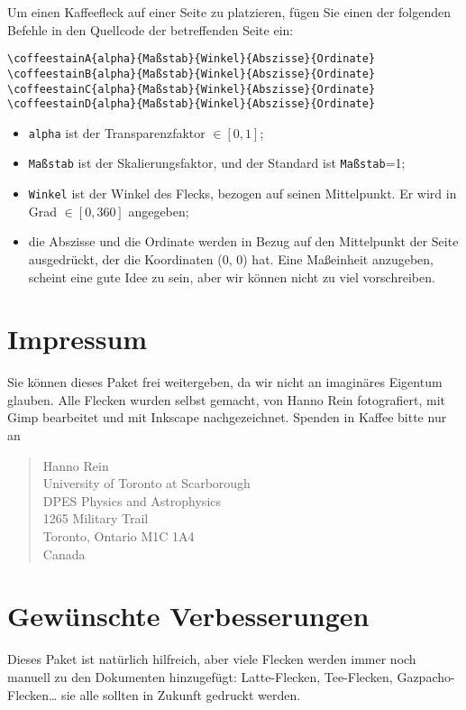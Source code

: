 \documentclass[a4paper, 11pt, BCOR = 0 pt, oneside]{scrartcl}
\begin{document}
Um einen Kaffeefleck auf einer Seite zu platzieren, fügen Sie einen der folgenden Befehle in den Quellcode der betreffenden Seite ein:
\begin{verbatim}
\coffeestainA{alpha}{Maßstab}{Winkel}{Abszisse}{Ordinate}
\coffeestainB{alpha}{Maßstab}{Winkel}{Abszisse}{Ordinate}
\coffeestainC{alpha}{Maßstab}{Winkel}{Abszisse}{Ordinate}
\coffeestainD{alpha}{Maßstab}{Winkel}{Abszisse}{Ordinate}
\end{verbatim}

\begin{itemize}
\item \texttt{alpha} ist der Transparenzfaktor $\in [0,1]$;
\item \texttt{Maßstab} ist der Skalierungsfaktor, und der Standard ist \texttt{Maßstab}=1;
\item \texttt{Winkel} ist der Winkel des Flecks, bezogen auf seinen
  Mittelpunkt. Er wird in Grad $\in [0,360]$ angegeben;
\item die Abszisse und die Ordinate werden in Bezug auf den Mittelpunkt der Seite ausgedrückt, der die Koordinaten (0, 0) hat. Eine Maßeinheit anzugeben, scheint eine gute Idee zu sein, aber wir können nicht zu viel vorschreiben.
\end{itemize}


\section{Impressum}
Sie können dieses Paket frei weitergeben, da wir nicht an imaginäres Eigentum
glauben. Alle Flecken wurden selbst gemacht, von Hanno Rein fotografiert, mit
Gimp bearbeitet und mit Inkscape nachgezeichnet. Spenden in Kaffee bitte nur an
\begin{quote}
Hanno Rein\\
University of Toronto at Scarborough\\
DPES Physics and Astrophysics\\
1265 Military Trail\\
Toronto, Ontario M1C 1A4\\
Canada
\end{quote}

\section{Gewünschte Verbesserungen}
Dieses Paket ist natürlich hilfreich, aber viele Flecken werden immer noch
manuell zu den Dokumenten hinzugefügt: Latte-Flecken, Tee-Flecken,
Gazpacho-Flecken\dots{} sie alle sollten in Zukunft gedruckt werden.
\end{document}

